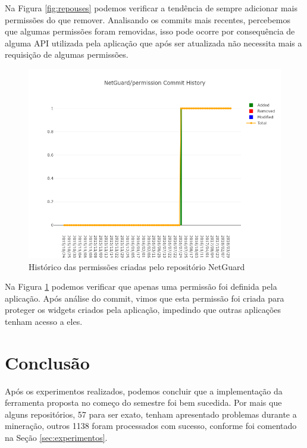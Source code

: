 \documentclass[a4paper,12pt]{article}
\begin{document}
{Na Figura \ref{fig:repouses} podemos verificar a tendência de sempre adicionar mais permissões do que remover. Analisando os commits mais recentes, percebemos que algumas permissões foram removidas, isso pode ocorre por consequência de alguma API utilizada pela aplicação que após ser atualizada não necessita mais a requisição de algumas permissões.

\begin{figure}[H]
\centering
\includegraphics[width=\linewidth,height=0.5\linewidth]{imgs/NetGuard_permission_history.png}
\caption{Histórico das permissões criadas pelo repositório NetGuard}
\label{fig:repopermission}
\end{figure}

Na Figura \ref{fig:repopermission} podemos verificar que apenas uma permissão foi definida pela aplicação. Após análise do commit, vimos que esta permissão foi criada para proteger os widgets criados pela aplicação, impedindo que outras aplicações tenham acesso a eles.


\newpage

\section{Conclusão}%

Após os experimentos realizados, podemos concluir que a implementação da ferramenta proposta no começo do semestre foi bem sucedida. Por mais que alguns repositórios, 57 para ser exato, tenham apresentado problemas durante a mineração, outros 1138 foram processados com sucesso, conforme foi comentado na Seção \ref{sec:experimentos}.

}
\end{document}
